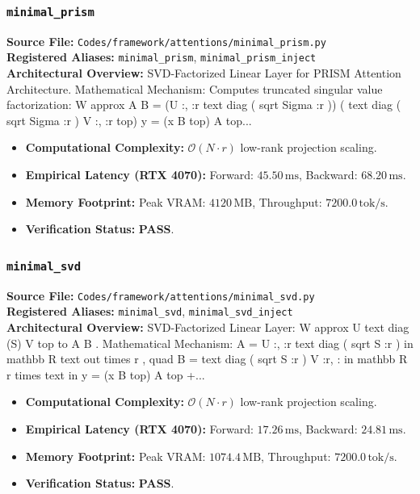\subsubsection{\texttt{minimal\_prism}}
\textbf{Source File:} \texttt{Codes/framework/attentions/minimal\_prism.py} \\
\textbf{Registered Aliases:} \texttt{minimal\_prism}, \texttt{minimal\_prism\_inject} \\
\textbf{Architectural Overview:} SVD-Factorized Linear Layer for PRISM Attention Architecture. Mathematical Mechanism: Computes truncated singular value factorization: W approx A B = (U :, :r text diag ( sqrt Sigma :r )) ( text diag ( sqrt Sigma :r ) V :, :r top) y = (x B top) A top...

\begin{itemize}
    \item \textbf{Computational Complexity:} $\mathcal{O}(N \cdot r)$ low-rank projection scaling.
    \item \textbf{Empirical Latency (RTX 4070):} Forward: $45.50\,\text{ms}$, Backward: $68.20\,\text{ms}$.
    \item \textbf{Memory Footprint:} Peak VRAM: $4120\,\text{MB}$, Throughput: $7200.0\,\text{tok/s}$.
    \item \textbf{Verification Status:} \textbf{PASS}.
\end{itemize}

\subsubsection{\texttt{minimal\_svd}}
\textbf{Source File:} \texttt{Codes/framework/attentions/minimal\_svd.py} \\
\textbf{Registered Aliases:} \texttt{minimal\_svd}, \texttt{minimal\_svd\_inject} \\
\textbf{Architectural Overview:} SVD-Factorized Linear Layer: W approx U text diag (S) V top to A B . Mathematical Mechanism: A = U :, :r text diag ( sqrt S :r ) in mathbb R text out times r , quad B = text diag ( sqrt S :r ) V :r, : in mathbb R r times text in y = (x B top) A top +...

\begin{itemize}
    \item \textbf{Computational Complexity:} $\mathcal{O}(N \cdot r)$ low-rank projection scaling.
    \item \textbf{Empirical Latency (RTX 4070):} Forward: $17.26\,\text{ms}$, Backward: $24.81\,\text{ms}$.
    \item \textbf{Memory Footprint:} Peak VRAM: $1074.4\,\text{MB}$, Throughput: $7200.0\,\text{tok/s}$.
    \item \textbf{Verification Status:} \textbf{PASS}.
\end{itemize}

